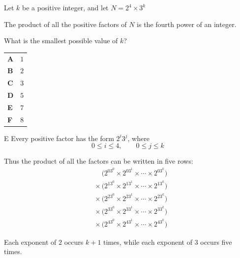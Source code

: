 \documentclass[11pt,a4paper]{article}
\begin{document}
\clearpage
\thispagestyle{djssolutions}
\vspace*{8pt}
\begin{enumerate}[label=\textbf{\arabic*.},leftmargin=*,itemsep=0pt,start=15]
\questionitem[Number]
Let $k$ be a positive integer, and let $N=2^4\times3^k$

The product of all the positive factors of $N$ is the fourth power of an integer. 

What is the smallest possible value of $k$?

\par\vspace*{12pt}
\begin{tabularx}{\linewidth}{@{}>{\bfseries}l Y@{}}
A &
$1$
\\[0.8em]
B &
$2$
\\[0.8em]
C &
$3$
\\[0.8em]
D &
$5$
\\[0.8em]
E &
$7$
\\[0.8em]
F &
$8$
\\
\end{tabularx}

\begin{djsSolution}{E}
Every positive factor has the form $2^i3^j$, where
\[
0\leq i\leq4,\qquad 0\leq j\leq k
\]

Thus the product of all the factors can be written in five rows:
\[
\begin{aligned}
&\phantom{{}\times{}}\bigl(2^03^0\times2^03^1\times\cdots\times2^03^k\bigr)\\[5pt]
&{}\times{}\bigl(2^13^0\times2^13^1\times\cdots\times2^13^k\bigr)\\[5pt]
&{}\times{}\bigl(2^23^0\times2^23^1\times\cdots\times2^23^k\bigr)\\[5pt]
&{}\times{}\bigl(2^33^0\times2^33^1\times\cdots\times2^33^k\bigr)\\[5pt]
&{}\times{}\bigl(2^43^0\times2^43^1\times\cdots\times2^43^k\bigr)
\end{aligned}
\]

Each exponent of $2$ occurs $k+1$ times, while each exponent of $3$ occurs five times. 


\end{djsSolution}
\end{enumerate}
\end{document}

